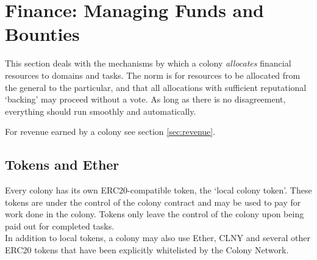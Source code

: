

\section{Finance: Managing Funds and Bounties}\label{sec:finance}
This section deals with the mechanisms by which a colony \emph{allocates} financial resources to domains and tasks. The norm is for resources to be allocated from the general to the particular, and that all allocations with sufficient reputational `backing' may proceed without a vote. As long as there is no disagreement, everything should run smoothly and automatically.

For revenue earned by a colony see section \ref{sec:revenue}.

\subsection{Tokens and Ether}
Every colony has its own ERC20-compatible token, the `local colony token'. These tokens are under the control of the colony contract and may be used to pay for work done in the colony. Tokens only leave the control of the colony upon being paid out for completed tasks.\\
In addition to local tokens, a colony may also use Ether, CLNY and several other ERC20 tokens that have been explicitly whitelisted by the Colony Network.


